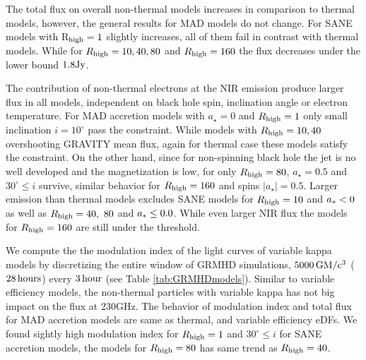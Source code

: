 
The total flux on overall non-thermal models increases in comparison to thermal models, however, the general results for MAD models do not change. For SANE models with R$_{\rm high}=1$ slightly increases, all of them fail in contrast with thermal models. While for $R_{\rm high}=10,40,80$ and $R_{\rm high}=160$ the flux decreases under the lower bound $1.8 \rm {Jy}$.


The contribution of non-thermal electrons at the NIR emission produce larger flux in all models, independent on black hole spin, inclination angle or electron temperature. For MAD accretion models with $a_{\star}=0$ and $R_{\rm high}=1$ only small inclination $i=10^{\circ}$ pass the constraint. While models with $R_{\rm high}=10,40$ overshooting GRAVITY mean flux, again for thermal case these models satisfy the constraint. On the other hand, since for non-spinning black hole the jet is no well developed and the magnetization is low, for only  $R_{\rm high}=80$, $a_{\star}=0.5$ and $30^{\circ} \leq i$ survive, similar behavior for $R_{\rm high}=160$ and spins $|a_{\star}|=0.5$.
Larger emission than thermal models excludes SANE models for $R_{\rm high}=10$ and $a_* < 0$ as well as  $R_{\rm high}=40,~80$ and $a_* \leq 0.0$. While even larger NIR flux the models for $R_{\rm high}=160$ are still under the threshold.


We compute the the modulation index  of the light curves of variable kappa models by discretizing the entire window of GRMHD simulations, $\rm 5000\,GM/c^3$ ($\rm 28\,hours$) every $\rm 3\,hour$ (see Table \ref{tab:GRMHDmodels}). Similar to variable efficiency models, the non-thermal particles with variable kappa has not big impact on the flux at 230GHz. The behavior of modulation index and total flux for MAD accretion models are same as thermal, and variable efficiency eDFs. We found sightly high modulation index for $R_{\rm high}=1$ and $30^{\circ} \leq i$ for SANE accretion models, the models for $R_{\rm high}=80$ has same trend as $R_{\rm high}=40$.



